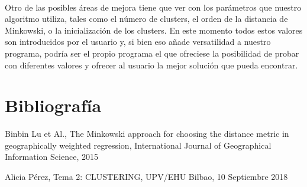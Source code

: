 \documentclass[10pt,a4paper]{article}
\begin{document}
	\paragraph{}
	Otro de las posibles áreas de mejora tiene que ver con los parámetros que nuestro algoritmo utiliza, tales como el número de clusters, el orden de la distancia de Minkowski, o la inicialización de los clusters. En este momento todos estos valores son introducidos por el usuario y, si bien eso añade versatilidad a nuestro programa, podría ser el propio programa el que ofreciese la posibilidad de probar con diferentes valores y ofrecer al usuario la mejor solución que pueda encontrar.
\section{Bibliografía}
\def\section*#1{} %

\begin{thebibliography}{}

Binbin Lu et Al., The Minkowski approach for choosing the distance metric in geographically weighted regression, International Journal of Geographical Information Science, 2015

Alicia Pérez, Tema 2: CLUSTERING, UPV/EHU Bilbao, 10 Septiembre 2018

\end{thebibliography}
\end{document}
